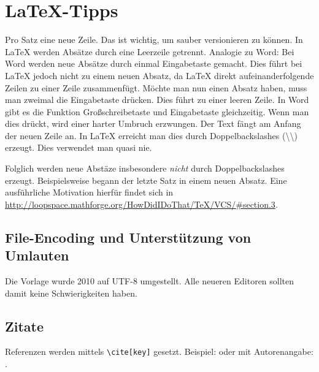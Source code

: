 
\chapter{LaTeX-Tipps}
\label{chap:latextipps}

Pro Satz eine neue Zeile.
Das ist wichtig, um sauber versionieren zu können.
In LaTeX werden Absätze durch eine Leerzeile getrennt.
Analogie zu Word: Bei Word werden neue Absätze durch einmal Eingabetaste gemacht.
Dies führt bei LaTeX jedoch nicht zu einem neuen Absatz, da LaTeX direkt aufeinanderfolgende Zeilen zu einer Zeile zusammenfügt.
Möchte man nun einen Absatz haben, muss man zweimal die Eingabetaste drücken.
Dies führt zu einer leeren Zeile.
In Word gibt es die Funktion Großschreibetaste und Eingabetaste gleichzeitig.
Wenn man dies drückt, wird einer harter Umbruch erzwungen.
Der Text fängt am Anfang der neuen Zeile an.
In LaTeX erreicht man dies durch Doppelbackslashes (\textbackslash\textbackslash) erzeugt.
Dies verwendet man quasi nie.

Folglich werden neue Abstäze insbesondere \emph{nicht} durch Doppelbackslashes erzeugt.
Beispielsweise begann der letzte Satz in einem neuen Absatz.
Eine ausführliche Motivation hierfür findet sich in \url{http://loopspace.mathforge.org/HowDidIDoThat/TeX/VCS/#section.3}.

\section{File-Encoding und Unterstützung von Umlauten}
\label{sec:firstsectioninlatexhints}
Die Vorlage wurde 2010 auf UTF-8 umgestellt.
Alle neueren Editoren sollten damit keine Schwierigkeiten haben.

\section{Zitate}
Referenzen werden mittels \texttt{\textbackslash cite[key]} gesetzt.
Beispiel: \cite{WSPA} oder mit Autorenangabe: \citet{WSPA}.

